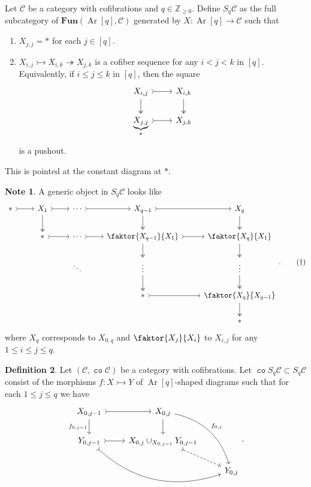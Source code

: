 \documentclass[10pt,letterpaper,cm]{nupset}
\theoremstyle{definition}
\newtheorem{definition}{Definition}
\newtheorem{note}[definition]{Note}
\theoremstyle{theorem}
\theoremstyle{remark}
\newcommand{\Z}{\mathbb Z}
\newcommand{\1}{\mathbf{1}}
\renewcommand{\c}{\mathscr{C}}
\newcommand{\0}{\vec 0}
\DeclareMathOperator{\co}{\mathtt{co}}
\DeclareMathOperator{\Ar}{Ar}
\begin{document}
Let $\c$ be a category with cofibrations and $q\in \Z_{\geq 0}$. Define $S_q\c$ as the full subcategory of $\mathbf{Fun}(\Ar\left[q\right], \c)$ generated by $X: \Ar\left[q\right] \to \c$ such that
\begin{enumerate}
\item $X_{j, j} = \ast$ for each $j \in \left[q\right]$.
\item $X_{i, j} \rightarrowtail X_{i, k} \twoheadrightarrow X_{j, k}$ is a cofiber sequence for any $i < j < k$ in $\left[q\right]$. Equivalently, if $i\leq j\leq k$ in $\left[q\right]$, then the square
\[
\begin{tikzcd}
{X_{i,j}} \arrow[d, two heads] \arrow[r, tail] & {X_{i,k}} \arrow[d, two heads] \\
{\underbrace{X_{j,j}}_{\ast}} \arrow[r, tail] & {X_{j,k}}
\end{tikzcd}
\]
is a pushout. 
\end{enumerate}
This is pointed at the constant diagram at $\ast$.


\begin{note}\label{note}
A generic object in $S_q\c$ looks like
\[ \label{eqn:D} 
\begin{tikzcd}
\ast \arrow[r, tail] & X_1 \arrow[r, tail] \arrow[d, two heads] & \cdots \arrow[r, tail] & X_{q-1} \arrow[r, tail] \arrow[d, two heads] & X_q \arrow[d, two heads] \\
 & \ast \arrow[r, tail] & \cdots \arrow[r, tail] & \faktor{X_{q-1}}{X_1} \arrow[d, two heads] \arrow[r, tail] & \faktor{X_q}{X_1} \arrow[d, two heads] \\
 &  & \ddots & \vdots \arrow[d, two heads] & \vdots \arrow[d, two heads] \\
 &  &  & \ast \arrow[r, tail] & \faktor{X_q}{X_{q-1}} \arrow[d, two heads] \\
 &  &  &  & \ast
\end{tikzcd}. \tag{$\dagger$}
\] where $X_q$ corresponds to $X_{0, q}$ and $\faktor{X_j}{X_i}$ to $X_{i, j}$ for any $1 \leq i \leq j \leq q$. 
\end{note}

\begin{definition}
Let $\left(\c, \co{\c}\right)$ be a category with cofibrations. Let $\co{S_q}\c \subset S_q \c$ consist of the morphisms $f: X \rightarrowtail Y$ of $\Ar\left[q\right]$-shaped diagrams such that for each $1\leq j \leq q$ we have
\[
\begin{tikzcd}
{X_{0, j-1}} \arrow[d, "{f_{0, j-1}}"'] \arrow[r, tail] & {X_{0, j}} \arrow[d] \arrow[rdd, "{f_{0, j}}", bend left] &  \\
{Y_{0, j-1}} \arrow[r, tail] \arrow[rrd, tail, bend right] & {X_{0, j} \cup_{X_{0, j-1}} Y_{0, j-1}} \arrow[rd, dashed, tail] &  \\
 &  & {Y_{0, j}}
\end{tikzcd}.
\]
\end{definition}
\end{document}
